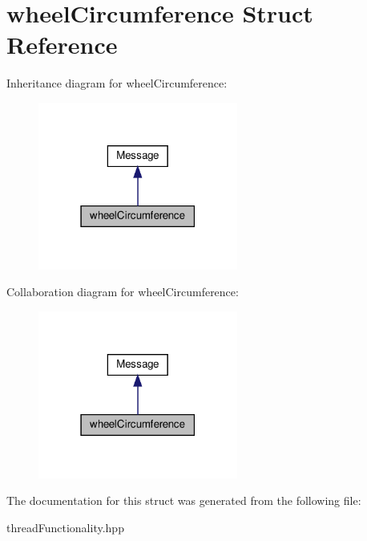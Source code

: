 \hypertarget{structwheelCircumference}{}\section{wheel\+Circumference Struct Reference}
\label{structwheelCircumference}


Inheritance diagram for wheel\+Circumference\+:\nopagebreak
\begin{figure}[H]
\begin{center}
\leavevmode
\includegraphics[width=186pt]{structwheelCircumference__inherit__graph}
\end{center}
\end{figure}


Collaboration diagram for wheel\+Circumference\+:\nopagebreak
\begin{figure}[H]
\begin{center}
\leavevmode
\includegraphics[width=186pt]{structwheelCircumference__coll__graph}
\end{center}
\end{figure}


The documentation for this struct was generated from the following file\+:\begin{DoxyCompactItemize}
\item 
thread\+Functionality.\+hpp\end{DoxyCompactItemize}
